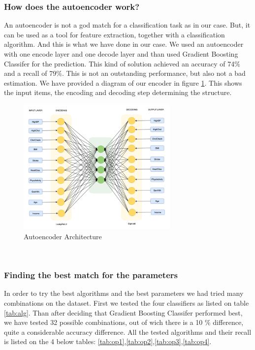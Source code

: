 \subsubsection{How does the autoencoder work?}
An autoencoder is not a god match for a classification task as in our case. But, it can be used as a tool for feature extraction, together with a classification algorithm. And this is what we have done in our case. We used an autoencoder with one encode layer and one decode layer and than used Gradient Boosting Classifer for the prediction. This kind of solution achieved an accuracy of 74$\%$ and a recall of 79$\%$. This is not an outstanding performance, but also not a bad estimation.
We have provided a diagram of our encoder in figure \ref{fig:autoencoder}. This shows the input items, the encoding and decoding step determining the structure.\\

\begin{figure}[h]
    \centering
    \includegraphics[width=0.7\textwidth]{images/autoencoder.png}
    \caption{Autoencoder Architecture}
    \label{fig:autoencoder}
\end{figure}\\

\subsubsection{Finding the best match for the parameters}
In order to try the best algorithms and the best parameters we had tried many combinations on the dataset.
First we tested the four classifiers as listed on table \ref{tab:alg}. Than after deciding that Gradient Boosting Classifer performed best, we have tested 32 possible combinations, out of wich there is a 10 $\%$ difference, quite a considerable accuracy difference.
All the tested algorithms and their recall is listed on the 4 below tables: \ref{tab:op1},\ref{tab:op2},\ref{tab:op3},\ref{tab:op4}.

